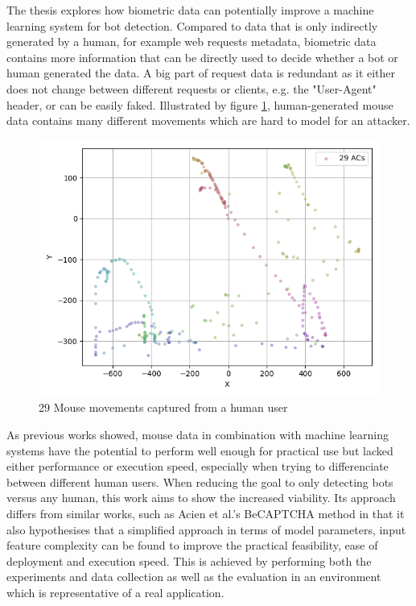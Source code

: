 \documentclass[
    fontsize=12pt,
    headings=small,
    parskip=half,           %
    bibliography=totoc,
    numbers=noenddot,       %
    open=any,               %
    final,                   %
    table
]{scrreprt}
\begin{document}
The thesis explores how biometric data can potentially improve a machine learning system for bot detection. Compared to data that is only indirectly generated by a human, for example web requests metadata, biometric data contains more information that can be directly used to decide whether a bot or human generated the data. A big part of request data is redundant as it either does not change between different requests or clients, e.g. the "User-Agent" header, or can be easily faked. Illustrated by figure \ref{fig:user_mouse_heatmap}, human-generated mouse data contains many different movements which are hard to model for an attacker.

\begin{figure}[h]
    \includegraphics[width=\textwidth]{figures/user_mouse_heatmap.png}
    \caption{29 Mouse movements captured from a human user}
    \label{fig:user_mouse_heatmap}
\end{figure}

As previous works showed, mouse data in combination with machine learning systems have the potential to perform well enough for practical use but lacked either performance or execution speed, especially when trying to differenciate between different human users. When reducing the goal to only detecting bots versus any human, this work aims to show the increased viability. Its approach differs from similar works, such as Acien et al.'s BeCAPTCHA method \cite{Acien2020BeCAPTCHAMouseSM} in that it also hypothesises that a simplified approach in terms of model parameters, input feature complexity can be found to improve the practical feasibility, ease of deployment and execution speed. This is achieved by performing both the experiments and data collection as well as the evaluation in an environment which is representative of a real application.
\end{document}
